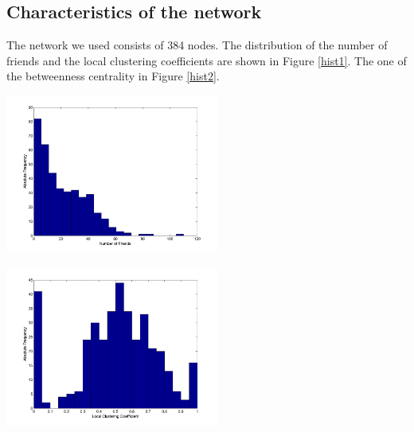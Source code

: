 

















\subsection{Characteristics of the network}

The network we used consists of 384 nodes. The distribution of the number of friends and the local clustering coefficients are shown in Figure \ref{hist1}. The one of the betweenness centrality in Figure \ref{hist2}.


\begin{minipage}{0.5\textwidth}
\includegraphics[width=7cm]{network_degreehist.png}
\end{minipage}
\begin{minipage}{0.5\textwidth}
\includegraphics[width=7cm]{network_clusterhist.png}
\end{minipage}
\label{hist1}


